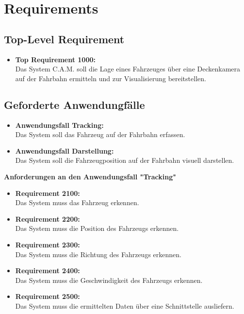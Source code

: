 \section{Requirements}

\subsection{Top-Level Requirement}
\begin{itemize}
\item \textbf{Top Requirement 1000:}\\
Das System C.A.M. soll die Lage eines Fahrzeuges \"uber eine Deckenkamera auf der Fahrbahn ermitteln und zur Visualisierung bereitstellen.
\end{itemize}

\subsection{Geforderte Anwendungf\"alle}

\begin{itemize}
\item \textbf{Anwendungsfall Tracking:}\\
Das System soll das Fahrzeug auf der Fahrbahn erfassen.
\item \textbf{Anwendungsfall Darstellung:}\\
Das System soll die Fahrzeugposition auf der Fahrbahn visuell darstellen.
\end{itemize}

\textbf{Anforderungen an den Anwendungsfall "Tracking"}
\begin{itemize}
\item  \textbf{Requirement 2100:}\\
Das System muss das Fahrzeug erkennen.
\item \textbf{Requirement 2200:}\\
Das System muss die Position des Fahrzeugs erkennen.
\item \textbf{ Requirement 2300:}\\
Das System muss die Richtung des Fahrzeugs erkennen.
\item\textbf{ Requirement 2400:}\\
Das System muss die Geschwindigkeit des Fahrzeugs erkennen.
\item \textbf{Requirement 2500:}\\
Das System muss die ermittelten Daten \"uber eine Schnittstelle ausliefern.
\end{itemize}

